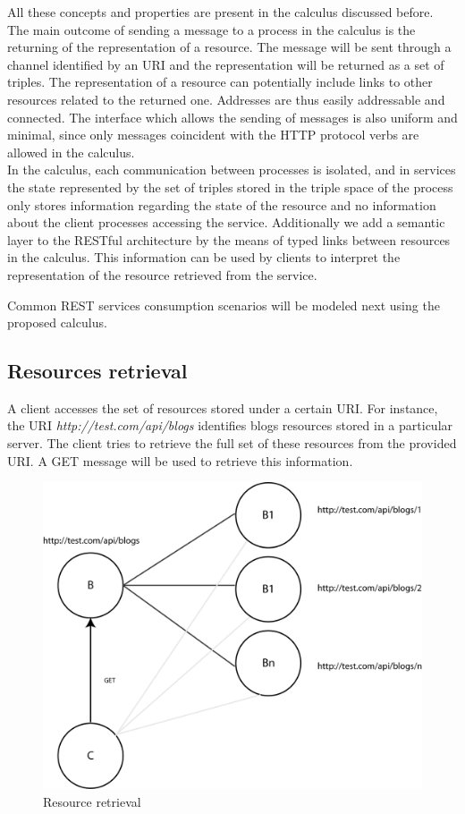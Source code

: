 All these concepts and properties are present in the calculus discussed before. The main outcome of sending a message to a process in the calculus is the returning of the representation of a resource. The message will be sent through a channel identified by an URI and the representation will be returned as a set of triples. The representation of a resource can potentially include links to other resources related to the returned one. Addresses are thus easily addressable and connected. The interface which allows the sending of messages is also uniform and minimal, since only messages coincident with the HTTP protocol verbs are allowed in the calculus.\\
In the calculus, each communication between processes is isolated, and in services the state represented by the set of triples stored in the triple space of the process only stores information regarding the state of the resource and no information about the client processes accessing the service.
Additionally we add a semantic layer to the RESTful architecture by the means of typed links between resources in the calculus. This information can be used by clients to interpret the representation of the resource retrieved from the service.

Common REST services consumption scenarios will be modeled next using the proposed calculus.

\subsection{Resources retrieval}

A client accesses the set of resources stored under a certain URI. For instance, the URI \emph{http://test.com/api/blogs} identifies blogs resources stored in a particular server. The client tries to retrieve the full set of these resources from the provided URI. A GET message will be used to retrieve this information.

\begin{figure}[htb!]
\centering%
\includegraphics{get_ex.png}
\caption{Resource retrieval}
\end{figure}

